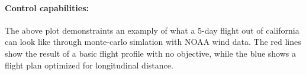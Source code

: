 \documentclass[12pt, twocolumn]{article}
\begin{document}
{\paragraph{\sffamily Control capabilities:} The above plot demonstraints an examply of what a 5-day flight out of california can look like through monte-carlo simlation with NOAA wind data. The red lines show the result of a basic flight profile with no objective, while the blue shows a flight plan optimized for longitudinal distance.
}
\end{document}
